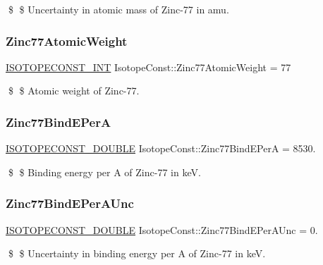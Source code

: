 \$ \$ Uncertainty in atomic mass of Zinc-\/77 in amu. \mbox{\label{group___isotope_const-_zinc-_zn77_ga0e0edac8ec4bfad965b42fb162c54b7f}} 
\subsubsection{\texorpdfstring{Zinc77\+Atomic\+Weight}{Zinc77AtomicWeight}}
{\footnotesize\ttfamily \mbox{\hyperlink{group___isotope_const-_macros_ga5f18360b3e99483a35c32d789e62621c}{I\+S\+O\+T\+O\+P\+E\+C\+O\+N\+S\+T\+\_\+\+I\+NT}} Isotope\+Const\+::\+Zinc77\+Atomic\+Weight = 77}

\$ \$ Atomic weight of Zinc-\/77. \mbox{\label{group___isotope_const-_zinc-_zn77_ga7f7660dde0393b3ac4640e4b68af1902}} 
\subsubsection{\texorpdfstring{Zinc77\+Bind\+E\+PerA}{Zinc77BindEPerA}}
{\footnotesize\ttfamily \mbox{\hyperlink{group___isotope_const-_macros_ga8f45a7272ce02c0b4c65c44636ed719a}{I\+S\+O\+T\+O\+P\+E\+C\+O\+N\+S\+T\+\_\+\+D\+O\+U\+B\+LE}} Isotope\+Const\+::\+Zinc77\+Bind\+E\+PerA = 8530.}

\$ \$ Binding energy per A of Zinc-\/77 in keV. \mbox{\label{group___isotope_const-_zinc-_zn77_ga279dce67ad22fe3132fe0299af8d3335}} 
\subsubsection{\texorpdfstring{Zinc77\+Bind\+E\+Per\+A\+Unc}{Zinc77BindEPerAUnc}}
{\footnotesize\ttfamily \mbox{\hyperlink{group___isotope_const-_macros_ga8f45a7272ce02c0b4c65c44636ed719a}{I\+S\+O\+T\+O\+P\+E\+C\+O\+N\+S\+T\+\_\+\+D\+O\+U\+B\+LE}} Isotope\+Const\+::\+Zinc77\+Bind\+E\+Per\+A\+Unc = 0.}

\$ \$ Uncertainty in binding energy per A of Zinc-\/77 in keV. \mbox{\label{group___isotope_const-_zinc-_zn77_ga7d6e40d8e149b7a7a3e6421b8f39d718}} 

